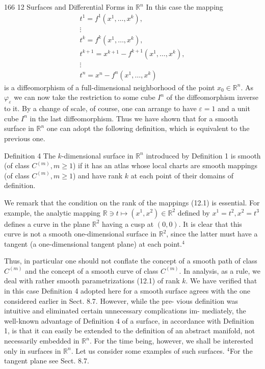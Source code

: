 166
12 Surfaces and Differential Forms in $\mathbb{R}^n$
In this case the mapping
$$
\begin{array}{l}
t^1 = f^1(x^1,\ldots,x^k), \\
\vdots \\
t^k = f^k(x^1,\ldots,x^k), \\
t^{k+1} = x^{k+1} - f^{k+1}(x^1,\ldots,x^k), \\
\vdots \\
t^n = x^n - f^n(x^1,\ldots,x^k)
\end{array}
$$
is a diffeomorphism of a full-dimensional neighborhood of the point $x_0 \in \mathbb{R}^n$. As $\varphi_{\varepsilon}$
we can now take the restriction to some cube $I^n$ of the diffeomorphism inverse to
it.
By a change of scale, of course, one can arrange to have $\varepsilon = 1$ and a unit cube
$I^n$ in the last diffeomorphism.
Thus we have shown that for a smooth surface in $\mathbb{R}^n$ one can adopt the following
definition, which is equivalent to the previous one.

Definition 4 The $k$-dimensional surface in $\mathbb{R}^n$ introduced by Definition 1 is smooth
(of class $C^{(m)}, m \geq 1$) if it has an atlas whose local charts are smooth mappings (of
class $C^{(m)}, m \geq 1$) and have rank $k$ at each point of their domains of definition.

We remark that the condition on the rank of the mappings (12.1) is essential. For
example, the analytic mapping $\mathbb{R} \ni t \mapsto (x^1, x^2) \in \mathbb{R}^2$ defined by $x^1 = t^2, x^2 = t^3$
defines a curve in the plane $\mathbb{R}^2$ having a cusp at $(0, 0)$. It is clear that this curve is
not a smooth one-dimensional surface in $\mathbb{R}^2$, since the latter must have a tangent
(a one-dimensional tangent plane) at each point.$^4$

Thus, in particular one should not conflate the concept of a smooth path of class
$C^{(m)}$ and the concept of a smooth curve of class $C^{(m)}$.
In analysis, as a rule, we deal with rather smooth parametrizations (12.1) of
rank $k$. We have verified that in this case Definition 4 adopted here for a smooth
surface agrees with the one considered earlier in Sect. 8.7. However, while the pre-
vious definition was intuitive and eliminated certain unnecessary complications im-
mediately, the well-known advantage of Definition 4 of a surface, in accordance
with Definition 1, is that it can easily be extended to the definition of an abstract
manifold, not necessarily embedded in $\mathbb{R}^n$. For the time being, however, we shall be
interested only in surfaces in $\mathbb{R}^n$.
Let us consider some examples of such surfaces.
$^4$For the tangent plane see Sect. 8.7.